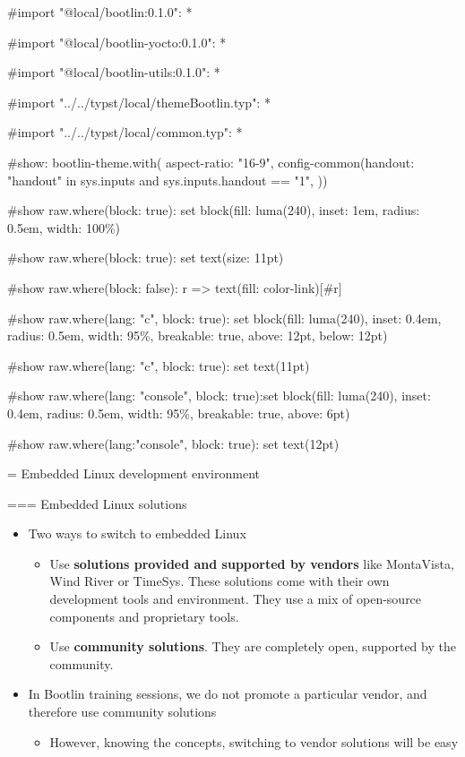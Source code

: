 #import "@local/bootlin:0.1.0": *

#import "@local/bootlin-yocto:0.1.0": *

#import "@local/bootlin-utils:0.1.0": *

#import "../../typst/local/themeBootlin.typ": *

#import "../../typst/local/common.typ": *

#show: bootlin-theme.with( aspect-ratio: "16-9", config-common(handout: "handout" in sys.inputs and sys.inputs.handout == "1", ))

#show raw.where(block: true): set block(fill: luma(240), inset: 1em, radius: 0.5em, width: 100\%)

#show raw.where(block: true): set text(size: 11pt)

#show raw.where(block: false): r => text(fill: color-link)[#r]

#show raw.where(lang: "c", block: true): set block(fill: luma(240), inset: 0.4em, radius: 0.5em, width: 95\%, breakable: true, above: 12pt, below: 12pt)

#show raw.where(lang: "c", block: true): set text(11pt)

#show raw.where(lang: "console", block: true):set block(fill: luma(240), inset: 0.4em, radius: 0.5em, width: 95\%, breakable: true, above: 6pt)

#show raw.where(lang:"console", block: true): set text(12pt)

 = Embedded Linux development environment

=== Embedded Linux solutions
  \begin{itemize}
  \item Two ways to switch to embedded Linux
    \begin{itemize}
    \item Use {\bf solutions provided and supported by vendors} like
      MontaVista, Wind River or TimeSys. These solutions come with
      their own development tools and environment. They use a mix of
      open-source components and proprietary tools.
    \item Use {\bf community solutions}. They are completely open,
      supported by the community.
    \end{itemize}
  \item In Bootlin training sessions, we do not promote a particular
    vendor, and therefore use community solutions
    \begin{itemize}
    \item However, knowing the concepts, switching to vendor solutions will be easy
    \end{itemize}
  \end{itemize}


